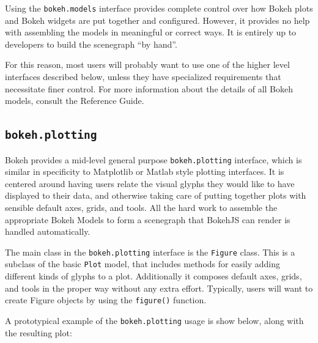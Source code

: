 \documentclass[a4paper,12pt]{article}
\begin{document}
Using the \texttt{bokeh.models} interface provides complete control over how Bokeh plots and Bokeh widgets are put together and configured. However, it provides no help with assembling the models in meaningful or correct ways. It is entirely up to developers to build the scenegraph “by hand”. 

For this reason, most users will probably want to use one of the higher level interfaces described below, unless they have specialized requirements that necessitate finer control. For more information about the details of all Bokeh models, consult the Reference Guide.
\newpage
\subsection*{\texttt{bokeh.plotting}}
Bokeh provides a mid-level general purpose \texttt{bokeh.plotting} interface, which is similar in specificity to Matplotlib or Matlab style plotting interfaces. It is centered around having users relate the visual glyphs they would like to have displayed to their data, and otherwise taking care of putting together plots with sensible default axes, grids, and tools. All the hard work to assemble the appropriate Bokeh Models to form a scenegraph that BokehJS can render is handled automatically.

The main class in the \texttt{bokeh.plotting} interface is the \texttt{Figure} class. This is a subclass of the basic \texttt{Plot} model, that includes methods for easily adding different kinds of glyphs to a plot. Additionally it composes default axes, grids, and tools in the proper way without any extra effort. Typically, users will want to create Figure objects by using the \texttt{figure()} function.

A prototypical example of the \texttt{bokeh.plotting} usage is show below, along with the resulting plot:
\end{document}
